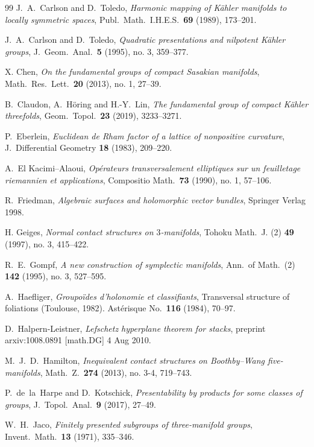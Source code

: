 \documentclass[12pt,leqno]{amsart}
\begin{document}
\begin{thebibliography}{99}
J.~A.~Carlson and D.~Toledo, {\em Harmonic mapping of K\"ahler manifolds to locally symmetric spaces},
Publ.~Math.~I.H.E.S.~{\bf 69} (1989), 173--201.

 
 J.~A.~Carlson and D.~Toledo,
  \emph{Quadratic presentations and nilpotent K\"ahler groups},
J.~Geom.~Anal.~{\bf 5} (1995), no. 3, 359--377. 
 
 
   
  
 X. Chen,
 \emph{On the fundamental groups of compact Sasakian manifolds},
 Math.~Res.~Lett.~{\bf 20} (2013), no. 1, 27--39.
 
B.~Claudon, A.~H\"oring and H.-Y.~Lin, 
\emph{The fundamental group of compact K\"ahler threefolds}, Geom.~Topol.~{\bf 23} (2019), 
3233--3271.   

 
P.~Eberlein, 
{\em Euclidean de Rham factor of a lattice of nonpositive curvature},
J.~Differential Geometry {\bf 18} (1983), 209--220.

 A.~El Kacimi--Alaoui,
 \emph{Op\'{e}rateurs transversalement elliptiques sur un feuilletage riemannien et applications},
 Compositio Math.~{\bf 73} (1990), no. 1, 57--106. 
 
 
R.~Friedman, {\sl Algebraic surfaces and holomorphic vector bundles}, Springer Verlag 1998.

 
 H. Geiges,
 \emph{Normal contact structures on $3$-manifolds},
  Tohoku Math.~J. (2) {\bf 49} (1997), no. 3, 415--422. 
 
 R.~E.~Gompf, 
 \emph{A new construction of symplectic manifolds},
 Ann.~of Math.~(2) {\bf 142} (1995), no. 3, 527--595. 
 
 
 A.~Haefliger, \emph{Groupo\"ides d'holonomie et classifiants}, 
Transversal structure of foliations (Toulouse, 1982). 
Ast\'erisque No.~{\bf 116} (1984), 70--97. 

 D.~Halpern-Leistner,
 \emph{Lefschetz hyperplane theorem for stacks}, preprint arxiv:1008.0891 [math.DG] 4 Aug 2010.
 
 M.~J.~D.~Hamilton,
 \emph{Inequivalent contact structures on Boothby--Wang five-manifolds},
 Math.~Z.~{\bf 274} (2013), no. 3-4, 719--743. 

P.~de~la~Harpe and D.~Kotschick, 
\emph{Presentability by products for some classes of groups}, 
J.~Topol.~Anal.~{\bf 9} (2017), 27--49.


 W.~H.~Jaco,
 \emph{Finitely presented subgroups of three-manifold groups},
  Invent.~Math.~{\bf 13} (1971), 335--346.
  

\end{thebibliography}
\end{document}
